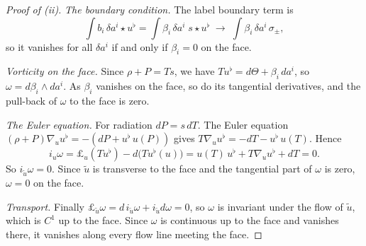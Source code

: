 \documentclass[11pt]{article}
\theoremstyle{canonmath}
\theoremstyle{canonpostulate}
\theoremstyle{canonproposition}
\theoremstyle{canonmath}
\theoremstyle{canonproposition}
\begin{document}
\begin{proof}[Proof of (ii)]
\emph{The boundary condition.} The label boundary term is
\[
\int b_i\,\delta a^i\star u^\flat = \int\beta_i\,\delta a^i\;s\star u^\flat \;\to\; \int\beta_i\,\delta a^i\,\sigma_\pm,
\]
so it vanishes for all $\delta a^i$ if and only if $\beta_i = 0$ on the face.

\emph{Vorticity on the face.} Since $\rho+P = Ts$, we have $Tu^\flat = d\Theta + \beta_i\,da^i$, so $\omega = d\beta_i\wedge da^i$. As $\beta_i$ vanishes on the face, so do its tangential derivatives, and the pull-back of $\omega$ to the face is zero.

\emph{The Euler equation.} For radiation $dP = s\,dT$. The Euler equation $(\rho+P)\nabla_uu^\flat = -(dP + u^\flat\,u(P))$ gives $T\nabla_uu^\flat = -dT - u^\flat\,u(T)$. Hence
\[
i_u\omega = \pounds_u(Tu^\flat) - d\bigl(Tu^\flat(u)\bigr) = u(T)\,u^\flat + T\nabla_uu^\flat + dT = 0 .
\]
So $i_{\tilde u}\omega = 0$. Since $\tilde u$ is transverse to the face and the tangential part of $\omega$ is zero, $\omega = 0$ on the face.

\emph{Transport.} Finally $\pounds_{\tilde u}\omega = d\,i_{\tilde u}\omega + i_{\tilde u}d\omega = 0$, so $\omega$ is invariant under the flow of $\tilde u$, which is $C^1$ up to the face. Since $\omega$ is continuous up to the face and vanishes there, it vanishes along every flow line meeting the face.
\end{proof}
\end{document}
